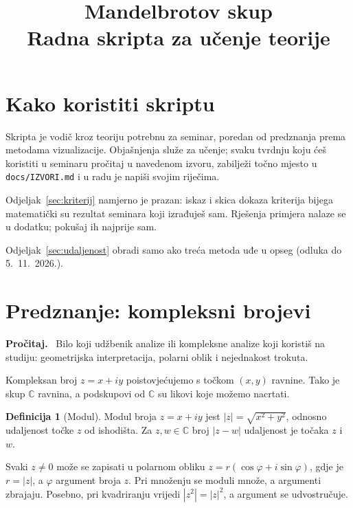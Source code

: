 \documentclass[11pt,a4paper]{article}
\title{Mandelbrotov skup\\\large Radna skripta za učenje teorije}
\author{}
\date{}
\theoremstyle{definition}
\newtheorem{definicija}{Definicija}[section]
\theoremstyle{plain}
\newenvironment{citaj}
  {\par\medskip\noindent\textbf{\color{blue!60!black}Pročitaj.}\ }
  {\par\medskip}
\newcommand{\C}{\mathbb{C}}
\begin{document}
\maketitle

\section*{Kako koristiti skriptu}

Skripta je vodič kroz teoriju potrebnu za seminar, poredan od predznanja
prema metodama vizualizacije. Objašnjenja služe za učenje; svaku tvrdnju
koju ćeš koristiti u seminaru pročitaj u navedenom izvoru, zabilježi točno
mjesto u \texttt{docs/IZVORI.md} i u radu je napiši svojim riječima.

Odjeljak~\ref{sec:kriterij} namjerno je prazan: iskaz i skica dokaza kriterija
bijega matematički su rezultat seminara koji izrađuješ sam. Rješenja primjera
nalaze se u dodatku; pokušaj ih najprije sam.

Odjeljak~\ref{sec:udaljenost} obradi samo ako treća metoda uđe u opseg
(odluka do 5.~11.~2026.).

\tableofcontents

\section{Predznanje: kompleksni brojevi}
\label{sec:kompleksni}

\begin{citaj}
Bilo koji udžbenik analize ili kompleksne analize koji koristiš na studiju:
geometrijska interpretacija, polarni oblik i nejednakost trokuta.
\end{citaj}

Kompleksan broj $z = x + iy$ poistovjećujemo s točkom $(x, y)$ ravnine. Tako
je skup $\C$ ravnina, a podskupovi od $\C$ su likovi koje možemo nacrtati.

\begin{definicija}[Modul]
Modul broja $z = x + iy$ jest $|z| = \sqrt{x^2 + y^2}$, odnosno udaljenost
točke $z$ od ishodišta. Za $z, w \in \C$ broj $|z - w|$ udaljenost je
točaka $z$ i $w$.
\end{definicija}

Svaki $z \neq 0$ može se zapisati u polarnom obliku $z = r(\cos\varphi +
i\sin\varphi)$, gdje je $r = |z|$, a $\varphi$ argument broja $z$. Pri
množenju se moduli množe, a argumenti zbrajaju. Posebno, pri kvadriranju
vrijedi $|z^2| = |z|^2$, a argument se udvostručuje.
\end{document}
